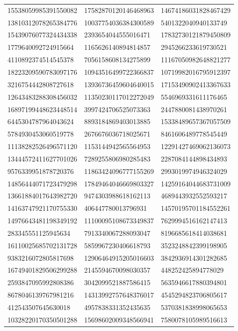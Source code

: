 \begin{longtable}{*{3}{l}}
15538059985391550082&17582870120146468963&14674186031828467429\\
13810312078265384776&10037754036384300589&5401322040940133749\\
15439076077324434338&2393654044555016471&17832730121879450809\\
1779640092724915664&1165626140894814857&2945266233619730521\\
4110892374514545378&7056158608134275899&11167050982648821277\\
18223209590783097176&10943516499722366837&10719982016795912397\\
3216754442808727618&13936736459604640015&17153490902413367633\\
12643483288308456032&11350230117012272049&5546969331611176465\\
16897199448623448514&3997424706525073363&2447880081438970261\\
6445304787964043624&8893184869403013885&15338489657367057509\\
5784930453060519778&2676676036718025671&8461606489778545449\\
11138282526496571120&1153144942565564953&12291427469062136073\\
13444572411627701026&7289255806980285483&2287084144898434893\\
9576339951878720376&11863424096777155269&2993019974946324029\\
14856444071723479298&17849464046669803327&14259164044683731009\\
13661884017643982720&9474303988618162113&4689443932552593217\\
14163747921170755330&406447780013796931&14570195701184552261\\
14976643481198349192&11100095108673349837&7629994516162147413\\
283345551125945634&7913340067288093047&8196685618414038681\\
16110025685702131728&5859967230406618793&3523248842399198905\\
9383216072805817698&12906464915205016603&3842936914301282685\\
16749401829506299288&2145594670098030357&448252425894778029\\
2593847095992808386&3042099521887586415&5635946617880394801\\
8678046139767981216&14313992757648376017&4545294823706805617\\
412543507645630018&4957838331352435635&5370381838998065653\\
10328220170350501288&15698602009348566941&7580078105989516613\\

\end{longtable}
